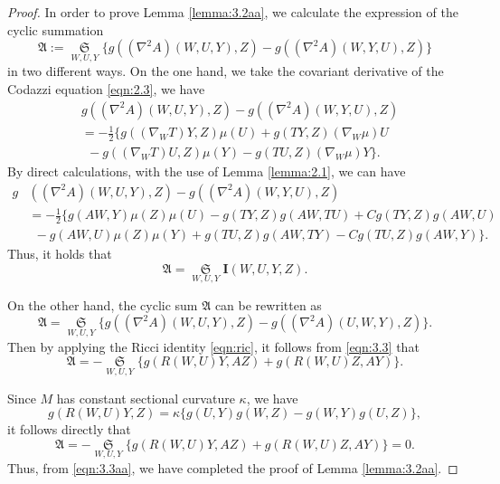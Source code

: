 \documentclass[reqno]{amsart}%
\theoremstyle{definition}
\numberwithin{equation}{section}
\begin{document}
\begin{proof}

In order to prove Lemma \ref{lemma:3.2aa}, we calculate the expression of the cyclic
summation
%
\begin{equation}\label{eqn:3.2}
\mathfrak{A}:=\mathop\mathfrak{S}\limits_{W,U,Y} \big\{g((\nabla^2 A)(W,U,Y),Z)-
g((\nabla^2 A)(W,Y,U),Z)\big\}
\end{equation}
in two different ways. On the one hand, we take the covariant derivative
of the Codazzi equation \eqref{eqn:2.3}, we have
\begin{equation*}
\begin{split}
&g((\nabla^2 A)(W,U,Y),Z)-g((\nabla^2 A)(W,Y,U),Z)\\
&=-\tfrac{1}{2}\{g((\nabla_W T)Y,Z)\mu(U)+g(TY,Z)(\nabla_W \mu)U\\
&\ \ -g((\nabla_W T)U,Z)\mu(Y)-g(TU,Z)(\nabla_W \mu)Y\}.
\end{split}
\end{equation*}
By direct calculations, with the use of Lemma \ref{lemma:2.1},
we can have
\begin{equation*}
\begin{split}
g&((\nabla^2 A)(W,U,Y),Z)-g((\nabla^2 A)(W,Y,U),Z)\\
&=-\tfrac{1}{2}\{g(AW,Y)\mu(Z)\mu(U)-g(TY,Z)g(AW,TU)+Cg(TY,Z)g(AW,U)\\
&\ \ -g(AW,U)\mu(Z)\mu(Y)+g(TU,Z)g(AW,TY)-Cg(TU,Z)g(AW,Y)\}.
\end{split}
\end{equation*}
Thus, it holds that
%
\begin{equation}\label{eqn:3.3aa}
\mathfrak{A}=\mathop\mathfrak{S}\limits_{W,U,Y}\mathbf{I}(W,U,Y,Z).
\end{equation}

On the other hand, the cyclic sum $\mathfrak{A}$ can be rewritten as
%
\begin{equation}\label{eqn:3.3}
\mathfrak{A}=\mathop\mathfrak{S}\limits_{W,U,Y}\big\{g((\nabla^{2}A)(W,U,Y),Z)
-g((\nabla^{2}A)(U,W,Y),Z)\big\}.
\end{equation}
%
Then by applying the Ricci identity \eqref{eqn:ric}, it follows from \eqref{eqn:3.3} that
%
\begin{equation}\label{eqn:3.4}
\mathfrak{A}=-\mathop\mathfrak{S}\limits_{W,U,Y} \big\{g(R(W,U)Y,AZ)
+g(R(W,U)Z,AY)\big\}.
\end{equation}


Since $M$ has constant sectional curvature $\kappa$, we have
%
\begin{equation}\label{eqn:3.6aa}
g(R(W,U)Y,Z)=\kappa\{g(U,Y)g(W,Z)-g(W,Y)g(U,Z)\},
\end{equation}
%
it follows directly that
$$
\mathfrak{A}=-\mathop\mathfrak{S}\limits_{W,U,Y} \big\{g(R(W,U)Y,AZ)
+g(R(W,U)Z,AY)\big\}=0.
$$
Thus, from \eqref{eqn:3.3aa}, we have completed the proof of Lemma \ref{lemma:3.2aa}.
\end{proof}
\end{document}
